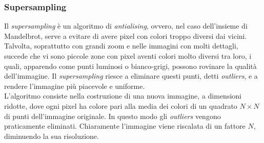 \documentclass[10pt]{report}
\begin{document}
			\subsubsection{Supersampling}
				Il \textit{supersampling} è un algoritmo di \textit{antialising}, ovvero, nel caso dell'insieme di Mandelbrot, serve a evitare di avere pixel con colori troppo diversi dai vicini.\\
				Talvolta, soprattutto con grandi zoom e nelle immagini con molti dettagli, succede che vi sono piccole zone con pixel aventi colori molto diversi tra loro, i quali, apparendo come punti luminosi o bianco-grigi, possono rovinare la qualità dell'immagine. Il \textit{supersampling} riesce a eliminare questi punti, detti \textit{outliers}, e a rendere l'immagine più piacevole e uniforme.\\
				L'algoritmo consiste nella costruzione di una nuova immagine, a dimensioni ridotte, dove ogni pixel ha colore pari alla media dei colori di un quadrato $N \times N$ di punti dell'immagine originale. In questo modo gli \textit{outliers} vengono praticamente eliminati. Chiaramente l'immagine viene riscalata di un fattore $N$, diminuendo la sua risoluzione.
\end{document}
